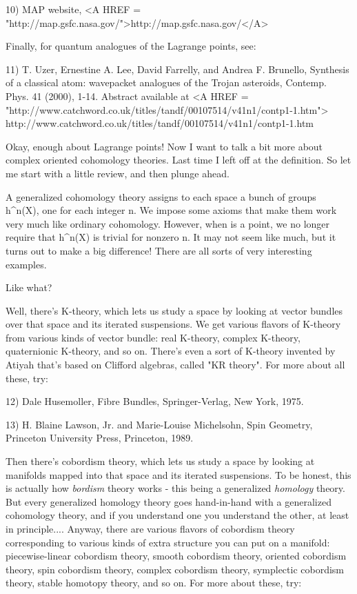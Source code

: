 10) MAP website, <A HREF = "http://map.gsfc.nasa.gov/">http://map.gsfc.nasa.gov/</A>

Finally, for quantum analogues of the Lagrange points, see:

11) T. Uzer, Ernestine A. Lee, David Farrelly, and Andrea F. Brunello,
Synthesis of a classical atom: wavepacket analogues of the Trojan asteroids,
Contemp. Phys. 41 (2000), 1-14.   Abstract available at
<A HREF = 
"http://www.catchword.co.uk/titles/tandf/00107514/v41n1/contp1-1.htm">
http://www.catchword.co.uk/titles/tandf/00107514/v41n1/contp1-1.htm

Okay, enough about Lagrange points!  Now I want to talk a bit more about
complex oriented cohomology theories.  Last time I left off at the 
definition.  So let me start with a little review, and then plunge ahead.

A generalized cohomology theory assigns to each space \times  a bunch of
groups h^{n}(X), one for each integer n.  We impose some axioms that make
them work very much like ordinary cohomology.   However, when \times  is a
point, we no longer require that h^{n}(X) is trivial for nonzero n.  It
may not seem like much, but it turns out to make a big difference!   
There are all sorts of very interesting examples.  

Like what?

Well, there's K-theory, which lets us study a space by looking at vector
bundles over that space and its iterated suspensions.  We get various
flavors of K-theory from various kinds of vector bundle: real K-theory,
complex K-theory, quaternionic K-theory, and so on.  There's even a sort
of K-theory invented by Atiyah that's based on Clifford algebras, called
"KR theory".  For more about all these, try:

12) Dale Husemoller, Fibre Bundles, Springer-Verlag, New York, 1975.

13) H. Blaine Lawson, Jr. and Marie-Louise Michelsohn, Spin Geometry, 
Princeton University Press, Princeton, 1989.
     
Then there's cobordism theory, which lets us study a space by looking at
manifolds mapped into that space and its iterated suspensions.  To be
honest, this is actually how \emph{bordism} theory works - this being a
generalized \emph{homology} theory.  But every generalized homology theory
goes hand-in-hand with a generalized cohomology theory, and if you
understand one you understand the other, at least in principle.... 
Anyway, there are various flavors of cobordism theory corresponding to
various kinds of extra structure you can put on a manifold: 
piecewise-linear cobordism theory, smooth cobordism theory, oriented 
cobordism theory, spin cobordism theory, complex cobordism theory, symplectic
cobordism theory, stable homotopy theory, and so on.  For more about
these, try:

